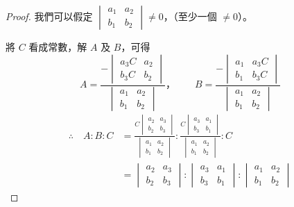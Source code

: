\begin{proof}
我們可以假定 $\begin{vmatrix} a_1 & a_2 \\ b_1 & b_2 \end{vmatrix} \neq 0$，（至少一個 $\neq 0$）。

將 $C$ 看成常數，解 $A$ 及 $B$，可得
\begin{equation*}
  A = \frac{-\begin{vmatrix} a_3 C & a_2 \\ b_3 C & b_2 \end{vmatrix}}{\begin{vmatrix} a_1 & a_2 \\ b_1 & b_2 \end{vmatrix}} \text{，} \qquad
  B = \frac{-\begin{vmatrix} a_1 & a_3 C \\ b_1 & b_3 C \end{vmatrix}}{\begin{vmatrix} a_1 & a_2 \\ b_1 & b_2 \end{vmatrix}}
\end{equation*}
\begin{align*}
  \therefore \quad A : B : C &= \frac{C \begin{vmatrix} a_2 & a_3 \\ b_2 & b_3 \end{vmatrix}}{\begin{vmatrix} a_1 & a_2 \\ b_1 & b_2 \end{vmatrix}} : \frac{C \begin{vmatrix} a_3 & a_1 \\ b_3 & b_1 \end{vmatrix}}{\begin{vmatrix} a_1 & a_2 \\ b_1 & b_2 \end{vmatrix}} : C \\
  &= \begin{vmatrix} a_2 & a_3 \\ b_2 & b_3 \end{vmatrix} : \begin{vmatrix} a_3 & a_1 \\ b_3 & b_1 \end{vmatrix} : \begin{vmatrix} a_1 & a_2 \\ b_1 & b_2 \end{vmatrix}
\end{align*}


\end{proof}
